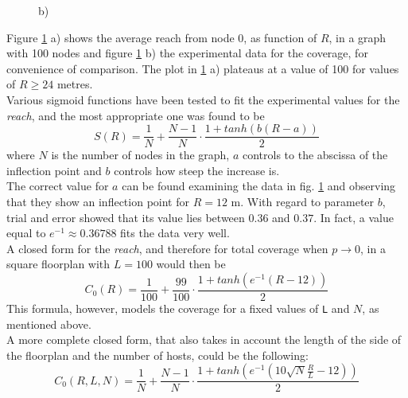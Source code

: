 \begin{figure}[H]
\begin{minipage}{.5\textwidth}
		\begin{center}
            b)
        \end{center}
	\end{minipage}
	\caption{}
    \label{fig:reachR30}
\end{figure}
\hfill \break
\hfill \break
Figure \ref{fig:reachR30} a) shows the average reach from node 0, as function of $R$, in a graph with 100 nodes and figure \ref{fig:reachR30} b) the experimental data for the coverage, for convenience of comparison. The plot in \ref{fig:reachR30} a)  plateaus at a value of 100 for values of $R \geq24$ metres. \\
Various sigmoid functions have been tested to fit the experimental values for the \textit{reach}, and the most appropriate one was found to be
\hfill \break
\begin{equation}\label{eq:reachSigmoidParametric}
	S(R) = \frac{1}{N} + \frac{N-1}{N}\cdot\frac{1+tanh(b(R-a))}{2}
\end{equation}
\hfill \break
where $N$ is the number of nodes in the graph, $a$ controls to the abscissa of the inflection point and $b$ controls how steep the increase is.\\
The correct value for $a$ can be found examining the data in fig. \ref{fig:reachR30} and observing that they show an inflection point for $R=12$ m. With regard to parameter $b$, trial and error showed that its value lies between $0.36$ and $0.37$. In fact, a value equal to $e^{-1} \approx 0.36788$ fits the data very well.\\
A closed form for the \textit{reach}, and therefore for total coverage when $p \to 0$, in a square floorplan with $L=100$ would then be
\hfill \break
\begin{equation}\label{eq:reachSigmoidNoL}
	C_{0}(R) = \frac{1}{100} + \frac{99}{100}\cdot\frac{1+tanh(e^{-1}(R - 12))}{2}
\end{equation}
\hfill \break
This formula, however, models the coverage for a fixed values of \texttt{L} and $N$, as mentioned above.\\
A more complete closed form, that also takes in account the length of the side of the floorplan and the number of hosts, could be the following:
\hfill \break
\begin{equation}\label{eq:reachSigmoidL}
	C_{0}(R, L, N) = \frac{1}{N} + \frac{N-1}{N}\cdot\frac{1+tanh(e^{-1}(10\sqrt{N}\frac{R}{L} - 12))}{2}
\end{equation}
\hfill \break
